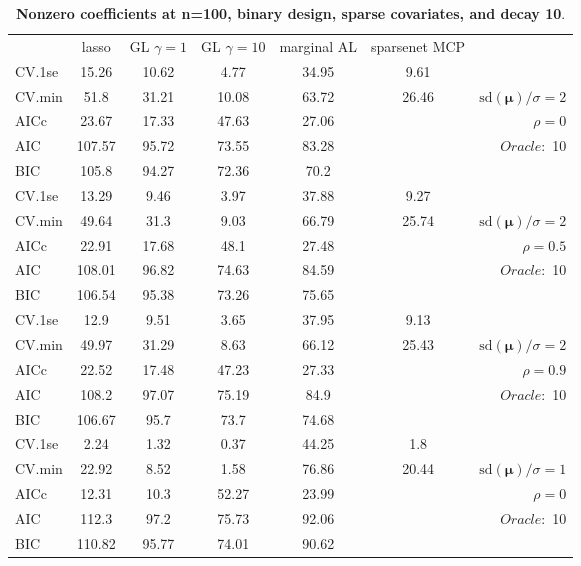 \begin{table}\vspace{-.5cm}
\caption[l]{ { \bf Nonzero coefficients at n=100, binary design, 
sparse covariates, and  decay  10}.}
\vspace{-.5cm}
\footnotesize{}
\begin{center}
\begin{tabular}{l*{5}{c}|r}
& lasso & GL $\gamma=1$ & GL $\gamma=10$ & marginal AL & sparsenet MCP  & \\
 \cline{1-7}
CV.1se & 15.26 & 10.62 & 4.77 & 34.95 & 9.61 & \\
CV.min & 51.8 & 31.21 & 10.08 & 63.72 & 26.46 &  $\mathrm{sd}(\mathbf{\mu})/\sigma=2$ \\
AICc & 23.67 & 17.33 & 47.63 & 27.06 & & $\rho=0$ \\
AIC & 107.57 & 95.72 & 73.55 & 83.28 & &  \multirow{2}{*}{$Oracle: $ 10} \\
BIC & 105.8 & 94.27 & 72.36 & 70.2 & &  \\
 \hline 
CV.1se & 13.29 & 9.46 & 3.97 & 37.88 & 9.27 & \\
CV.min & 49.64 & 31.3 & 9.03 & 66.79 & 25.74 &  $\mathrm{sd}(\mathbf{\mu})/\sigma=2$ \\
AICc & 22.91 & 17.68 & 48.1 & 27.48 & & $\rho=0.5$ \\
AIC & 108.01 & 96.82 & 74.63 & 84.59 & &  \multirow{2}{*}{$Oracle: $ 10} \\
BIC & 106.54 & 95.38 & 73.26 & 75.65 & &  \\
 \hline 
CV.1se & 12.9 & 9.51 & 3.65 & 37.95 & 9.13 & \\
CV.min & 49.97 & 31.29 & 8.63 & 66.12 & 25.43 &  $\mathrm{sd}(\mathbf{\mu})/\sigma=2$ \\
AICc & 22.52 & 17.48 & 47.23 & 27.33 & & $\rho=0.9$ \\
AIC & 108.2 & 97.07 & 75.19 & 84.9 & &  \multirow{2}{*}{$Oracle: $ 10} \\
BIC & 106.67 & 95.7 & 73.7 & 74.68 & &  \\
 \hline 
CV.1se & 2.24 & 1.32 & 0.37 & 44.25 & 1.8 & \\
CV.min & 22.92 & 8.52 & 1.58 & 76.86 & 20.44 &  $\mathrm{sd}(\mathbf{\mu})/\sigma=1$ \\
AICc & 12.31 & 10.3 & 52.27 & 23.99 & & $\rho=0$ \\
AIC & 112.3 & 97.2 & 75.73 & 92.06 & &  \multirow{2}{*}{$Oracle: $ 10} \\
BIC & 110.82 & 95.77 & 74.01 & 90.62 & &  \\

\end{tabular}
\end{center}
\end{table}
